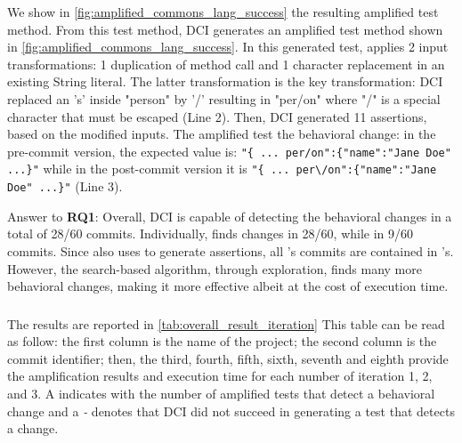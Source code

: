 We show in \autoref{fig:amplified_commons_lang_success} 
the resulting amplified test method.
From this test method, DCI generates an amplified test method shown in \autoref{fig:amplified_commons_lang_success}. 
In this generated test, \sbampl applies 2 input transformations: 1 duplication of method call and 1 character replacement in an existing String literal.
The latter transformation is the key transformation: DCI replaced an 's' inside "person" by '/' resulting in "per/on" where "/" is a special character that must be escaped (Line 2). 
Then, DCI generated 11 assertions, based on the modified inputs. 
The amplified test the behavioral change:
in the pre-commit version, the expected value is: \texttt{"\{ ... per/on":\{"name":"Jane Doe" ...\}"} while in the post-commit version it is \texttt{"\{ ... per\textbackslash/on":\{"name":"Jane Doe" ...\}"} (Line 3).
 
\begin{mdframed}
Answer to \textbf{RQ1}: Overall, DCI is capable of detecting the behavioral changes in a total of 28/60 commits. Individually, \DCII finds changes in 28/60, while \DCIA in 9/60 commits.
Since \DCII also uses \aampl to generate assertions, all \DCIA's commits are contained in \DCII's. However, the search-based algorithm, through exploration, finds many more behavioral changes, making it more effective albeit at the cost of execution time.
\end{mdframed}


\subsubsection{\rqiteration}
\label{subsubsec:answerqiteration}

The results are reported in \autoref{tab:overall_result_iteration}
This table can be read as follow:
the first column is the name of the project;
the second column is the commit identifier;
then, the third, fourth, fifth, sixth, seventh and eighth provide the amplification results and execution time for each number of iteration 1, 2, and 3. A \cmark indicates with the number of amplified tests that detect a behavioral change and a \textit{-} denotes that DCI did not succeed in generating a test that detects a change.

